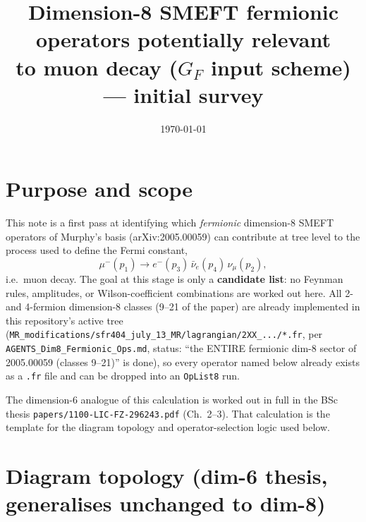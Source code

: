 \documentclass[11pt,a4paper]{article}
\title{Dimension-8 SMEFT fermionic operators potentially relevant\\
to muon decay ($G_F$ input scheme) --- initial survey}
\author{}
\date{\today}
\begin{document}
\maketitle

\section{Purpose and scope}

This note is a first pass at identifying which \emph{fermionic} dimension-8
SMEFT operators of Murphy's basis (arXiv:2005.00059) can contribute at tree
level to the process used to define the Fermi constant,
\[
\mu^-(p_1) \to e^-(p_3)\, \bar\nu_e(p_4)\, \nu_\mu(p_2) ,
\]
i.e.\ muon decay. The goal at this stage is only a \textbf{candidate list}:
no Feynman rules, amplitudes, or Wilson-coefficient combinations are worked
out here. All 2- and 4-fermion dimension-8 classes (9--21 of the paper) are
already implemented in this repository's active tree
(\texttt{MR\_modifications/sfr404\_july\_13\_MR/lagrangian/2XX\_.../*.fr},
per \texttt{AGENTS\_Dim8\_Fermionic\_Ops.md}, status: ``the ENTIRE fermionic
dim-8 sector of 2005.00059 (classes 9--21)'' is done), so every operator
named below already exists as a \texttt{.fr} file and can be dropped into an
\texttt{OpList8} run.

The dimension-6 analogue of this calculation is worked out in full in the
BSc thesis \texttt{papers/1100-LIC-FZ-296243.pdf} (Ch.~2--3). That
calculation is the template for the diagram topology and operator-selection
logic used below.

\section{Diagram topology (dim-6 thesis, generalises unchanged to dim-8)}
\end{document}
